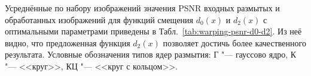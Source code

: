 Усреднённые по набору изображений значения PSNR входных размытых и обработанных изображений для функций смещения $d_0\left(x\right)$ и $d_2\left(x\right)$ с оптимальными параметрами приведены в Табл.~\ref{tab:warping-psnr-d0-d2}. Из неё видно, что предложенная функция $d_2\left(x\right)$ позволяет достичь более качественного результата. Условные обозначения типов ядер размытия: Г "--- гауссово ядро, К "--- <<круг>>, КЦ "--- <<круг с кольцом>>.


